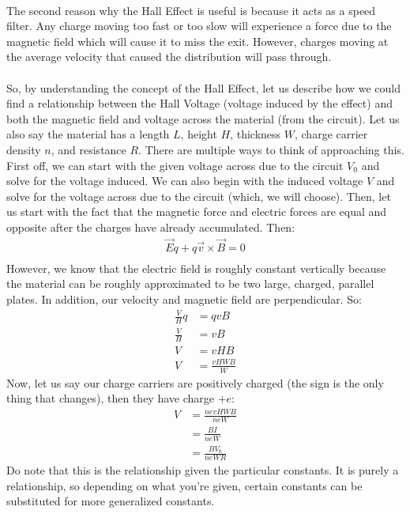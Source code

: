 \documentclass{article}
\begin{document}
\\
The second reason why the Hall Effect is useful is because it acts as a speed filter. Any charge moving too fast or too slow will experience a force due to the magnetic field which will cause it to miss the exit. However, charges moving at the average velocity that caused the distribution will pass through. \\
\\
So, by understanding the concept of the Hall Effect, let us describe how we could find a relationship between the Hall Voltage (voltage induced by the effect) and both the magnetic field and voltage across the material (from the circuit). Let us also say the material has a length $L$, height $H$, thickness $W$, charge carrier density $n$, and resistance $R$. There are multiple ways to think of approaching this. First off, we can start with the given voltage across due to the circuit $V_0$ and solve for the voltage induced. We can also begin with the induced voltage $V$ and solve for the voltage across due to the circuit (which, we will choose). Then, let us start with the fact that the magnetic force and electric forces are equal and opposite after the charges have already accumulated. Then:
\begin{align*}
    \vec{E}q + q\vec{v}\times\vec{B} = 0\\
\end{align*}
However, we know that the electric field is roughly constant vertically because the material can be roughly approximated to be two large, charged, parallel plates. In addition, our velocity and magnetic field are perpendicular. So:
\begin{align*}
    \frac{V}{H}q &= qvB\\
    \frac{V}{H} &= vB\\
    V &= vHB\\
    V &= \frac{vHWB}{W}
\end{align*}
Now, let us say our charge carriers are positively charged (the sign is the only thing that changes), then they have charge $+e$:
\begin{align*}
    V &= \frac{nevHWB}{neW}\\
    &= \frac{BI}{neW}\\
    &= \frac{BV_0}{neWR}
\end{align*}
Do note that this is the relationship given the particular constants. It is purely a relationship, so depending on what you're given, certain constants can be substituted for more generalized constants. \\
\end{document}
